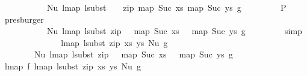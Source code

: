 \begin{isabellebody}
\ \ \ \ \ \ \ \ \ \ \ Nu\ {\isacharparenleft}{\kern0pt}lmap\ {\isacharparenleft}{\kern0pt}lsubst\ {\isacharparenleft}{\kern0pt}{\isacharparenleft}{\kern0pt}{}{\isacharcomma}{\kern0pt}\ {}{\isacharparenright}{\kern0pt}\ {\isacharhash}{\kern0pt}\ zip\ {\isacharparenleft}{\kern0pt}map\ Suc\ xs{\isacharparenright}{\kern0pt}\ {\isacharparenleft}{\kern0pt}map\ Suc\ ys{\isacharparenright}{\kern0pt}{\isacharparenright}{\kern0pt}{\isacharparenright}{\kern0pt}\ g{\isacharparenright}{\kern0pt}{\isachardoublequoteclose}\isanewline
\ \ \ \ \ \ \ \isamarkupfalse%
\ P{}\ \isamarkupfalse%
\ presburger\isanewline
\ \ \ \ \ \isamarkupfalse%
\ \isamarkupfalse%
\ {\isachardoublequoteopen}{\isachardot}{\kern0pt}{\isachardot}{\kern0pt}{\isachardot}{\kern0pt}\ {\isacharequal}{\kern0pt}\isanewline
\ \ \ \ \ \ \ \ \ \ \ Nu\ {\isacharparenleft}{\kern0pt}lmap\ {\isacharparenleft}{\kern0pt}lsubst\ {\isacharparenleft}{\kern0pt}zip\ {\isacharparenleft}{\kern0pt}{}\ {\isacharhash}{\kern0pt}\ map\ Suc\ xs{\isacharparenright}{\kern0pt}\ {\isacharparenleft}{\kern0pt}{}\ {\isacharhash}{\kern0pt}\ map\ Suc\ ys{\isacharparenright}{\kern0pt}{\isacharparenright}{\kern0pt}{\isacharparenright}{\kern0pt}\ g{\isacharparenright}{\kern0pt}{\isachardoublequoteclose}\isanewline
\ \ \ \ \ \ \ \isamarkupfalse%
\ simp\isanewline
\ \ \ \ \ \isamarkupfalse%
\ \isamarkupfalse%
\isanewline
\ \ \ \ \ \ \ {\isachardoublequoteopen}lmap\ {\isacharparenleft}{\kern0pt}lsubst\ {\isacharparenleft}{\kern0pt}zip\ xs\ ys{\isacharparenright}{\kern0pt}{\isacharparenright}{\kern0pt}\ {\isacharparenleft}{\kern0pt}Nu\ g{\isacharparenright}{\kern0pt}\ {\isacharequal}{\kern0pt}\isanewline
\ \ \ \ \ \ \ \ Nu\ {\isacharparenleft}{\kern0pt}lmap\ {\isacharparenleft}{\kern0pt}lsubst\ {\isacharparenleft}{\kern0pt}zip\ {\isacharparenleft}{\kern0pt}{}\ {\isacharhash}{\kern0pt}\ map\ Suc\ xs{\isacharparenright}{\kern0pt}\ {\isacharparenleft}{\kern0pt}{}\ {\isacharhash}{\kern0pt}\ map\ Suc\ ys{\isacharparenright}{\kern0pt}{\isacharparenright}{\kern0pt}{\isacharparenright}{\kern0pt}\ g{\isacharparenright}{\kern0pt}{\isachardoublequoteclose}\ \isakeywordONE{{\isachardot}{\kern0pt}}\isamarkupfalse%
\isanewline
\ \ \ \isamarkupfalse%
\isanewline
\isanewline
\isanewline
\ \ \isamarkupfalse%
\ {\isachardoublequoteopen}lmap\ f\ {\isacharparenleft}{\kern0pt}lmap\ {\isacharparenleft}{\kern0pt}lsubst\ {\isacharparenleft}{\kern0pt}zip\ xs\ ys{\isacharparenright}{\kern0pt}{\isacharparenright}{\kern0pt}\ {\isacharparenleft}{\kern0pt}Nu\ g{\isacharparenright}{\kern0pt}{\isacharparenright}{\kern0pt}\ {\isacharequal}{\kern0pt}\isanewline

\end{isabellebody}
